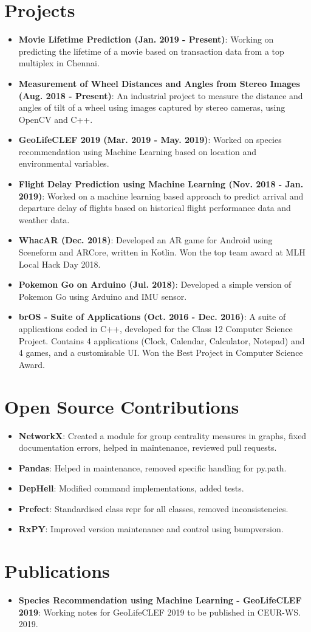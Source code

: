 \documentclass[letterpaper,11pt]{article}
\newcommand{\resumeItem}[2]{
\item\small{
\textbf{#1}{: #2 \vspace{-2pt}}
}
}
\newcommand{\resumeSubHeadingListStart}{\begin{itemize}[leftmargin=*]}
\newcommand{\resumeSubHeadingListEnd}{\end{itemize}}
\begin{document}
\section{Projects}
\resumeSubHeadingListStart
\resumeItem{Movie Lifetime Prediction (Jan. 2019 - Present)}{Working on predicting the lifetime of a movie based on transaction data from a top multiplex in Chennai.}
\resumeItem{Measurement of Wheel Distances and Angles from Stereo Images (Aug. 2018 - Present)}{An industrial project to measure the distance and angles of tilt of a wheel using images captured by stereo cameras, using OpenCV and C++.}
\resumeItem{GeoLifeCLEF 2019 (Mar. 2019 - May. 2019)}{Worked on species recommendation using Machine Learning based on location and environmental variables.}
\resumeItem{Flight Delay Prediction using Machine Learning (Nov. 2018 - Jan. 2019)}{Worked on a machine learning based approach to predict arrival and departure delay of flights based on historical flight performance data and weather data.}
\resumeItem{WhacAR (Dec. 2018)}{Developed an AR game for Android using Sceneform and ARCore, written in Kotlin. Won the top team award at MLH Local Hack Day 2018.}
\resumeItem{Pokemon Go on Arduino (Jul. 2018)}{Developed a simple version of Pokemon Go using Arduino and IMU sensor.}
\resumeItem{brOS - Suite of Applications (Oct. 2016 - Dec. 2016)}{A suite of applications coded in C++, developed for the Class 12 Computer Science Project. Contains 4 applications (Clock, Calendar, Calculator, Notepad) and 4 games, and a customisable UI. Won the Best Project in Computer Science Award.}
\resumeSubHeadingListEnd

\section{Open Source Contributions}
\resumeSubHeadingListStart
\resumeItem{NetworkX}{Created a module for group centrality measures in graphs, fixed documentation errors, helped in maintenance, reviewed pull requests.}
\resumeItem{Pandas}{Helped in maintenance, removed specific handling for py.path.}
\resumeItem{DepHell}{Modified command implementations, added tests.}
\resumeItem{Prefect}{Standardised class repr for all classes, removed inconsistencies.}
\resumeItem{RxPY}{Improved version maintenance and control using bumpversion.}
\resumeSubHeadingListEnd

\section{Publications}
\resumeSubHeadingListStart
\resumeItem{Species Recommendation using Machine Learning - GeoLifeCLEF 2019}{Working notes for GeoLifeCLEF 2019 to be published in CEUR-WS. 2019.}
\resumeSubHeadingListEnd
\end{document}
